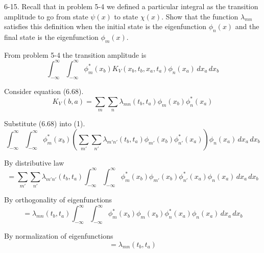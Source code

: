 \documentclass[12pt]{article}
\begin{document}
6-15.
Recall that in problem 5-4 we defined a particular integral as the
transition amplitude to go from state $\psi(x)$ to state $\chi(x)$.
Show that the function $\lambda_{mn}$ satisfies this definition
when the initial state is the eigenfunction $\phi_n(x)$ and the
final state is the eigenfunction $\phi_m(x)$.

\bigskip
From problem 5-4 the transition amplitude is
\begin{equation*}
\int_{-\infty}^\infty\int_{-\infty}^\infty
\phi_m^*(x_b)K_V(x_b,t_b,x_a,t_a)\phi_n(x_a)\,dx_a\,dx_b
\tag{1}
\end{equation*}

Consider equation (6.68).
\begin{equation*}
K_V(b,a)=\sum_m\sum_n\lambda_{mn}(t_b,t_a)\phi_m(x_b)\phi_n^*(x_a)
\tag{6.68}
\end{equation*}

Substitute (6.68) into (1).
\begin{equation*}
\int_{-\infty}^\infty\int_{-\infty}^\infty
\phi_m^*(x_b)
\left(\sum_{m'}\sum_{n'}\lambda_{m'n'}(t_b,t_a)\phi_{m'}(x_b)\phi_{n'}^*(x_a)\right)
\phi_n(x_a)\,dx_a\,dx_b
\end{equation*}

By distributive law
\begin{equation*}
{}=\sum_{m'}\sum_{n'}\lambda_{m'n'}(t_b,t_a)
\int_{-\infty}^\infty\int_{-\infty}^\infty
\phi_m^*(x_b)\phi_{m'}(x_b)
\phi_{n'}^*(x_a)\phi_n(x_a)
\,dx_a\,dx_b
\end{equation*}

By orthogonality of eigenfunctions
\begin{equation*}
{}=\lambda_{mn}(t_b,t_a)\int_{-\infty}^\infty\int_{-\infty}^\infty
\phi_m^*(x_b)\phi_m(x_b)
\phi_n^*(x_a)\phi_n(x_a)
\,dx_a\,dx_b
\end{equation*}

By normalization of eigenfunctions
\begin{equation*}
{}=\lambda_{mn}(t_b,t_a)
\end{equation*}
\end{document}
